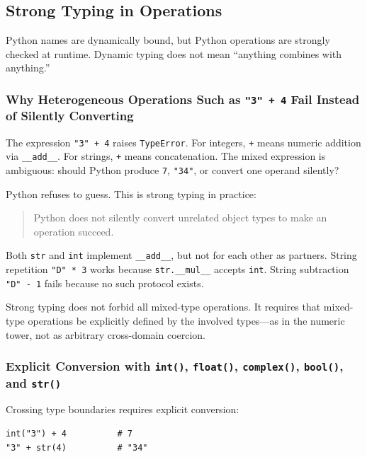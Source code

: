 \subsection{Strong Typing in Operations}

Python names are dynamically bound, but Python operations are strongly checked at runtime. Dynamic typing does not mean ``anything combines with anything.''

\subsubsection{Why Heterogeneous Operations Such as \texttt{"3" + 4} Fail Instead of Silently Converting}

The expression \texttt{"3" + 4} raises \texttt{TypeError}. For integers, \texttt{+} means numeric addition via \texttt{\_\_add\_\_}. For strings, \texttt{+} means concatenation. The mixed expression is ambiguous: should Python produce \texttt{7}, \texttt{"34"}, or convert one operand silently?

Python refuses to guess. This is strong typing in practice:

\begin{quote}
Python does not silently convert unrelated object types to make an operation succeed.
\end{quote}

Both \texttt{str} and \texttt{int} implement \texttt{\_\_add\_\_}, but not for each other as partners. String repetition \texttt{"D" * 3} works because \texttt{str.\_\_mul\_\_} accepts \texttt{int}. String subtraction \texttt{"D" - 1} fails because no such protocol exists.

Strong typing does not forbid all mixed-type operations. It requires that mixed-type operations be explicitly defined by the involved types---as in the numeric tower, not as arbitrary cross-domain coercion.

\subsubsection{Explicit Conversion with \texttt{int()}, \texttt{float()}, \texttt{complex()}, \texttt{bool()}, and \texttt{str()}}

Crossing type boundaries requires explicit conversion:

\begin{verbatim}
int("3") + 4          # 7
"3" + str(4)          # "34"
\end{verbatim}

